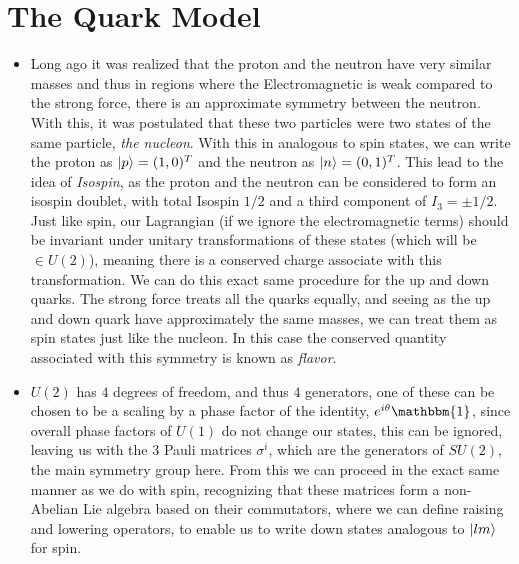 \documentclass[11pt]{article}
\numberwithin{equation}{section}
\begin{document}
\section{The Quark Model}
\begin{itemize}
    \item Long ago it was realized that the proton and the neutron have very similar masses and thus in regions where the Electromagnetic is weak compared to the strong force, there is an approximate symmetry between the neutron. With this, it was postulated that these two particles were two states of the same particle, \emph{the nucleon}. With this in analogous to spin states, we can write the proton as $\ket{p} = (1,0)^T$ and the neutron as $\ket{n} = (0,1)^T$. This lead to the idea of \emph{Isospin}, as the proton and the neutron can be considered to form an isospin doublet, with total Isospin $1/2$ and a third component of $I_3 = \pm1/2$. Just like spin, our Lagrangian (if we ignore the electromagnetic terms) should be invariant under unitary transformations of these states (which will be $\in U(2)$), meaning there is a conserved charge associate with this transformation. We can do this exact same procedure for the up and down quarks. The strong force treats all the quarks equally, and seeing as the up and down quark have approximately the same masses, we can treat them as spin states just like the nucleon. In this case the conserved quantity associated with this symmetry is known as \emph{flavor}. 

    \item $U(2)$ has $4$ degrees of freedom, and thus $4$ generators, one of these can be chosen to be a scaling by a phase factor of the identity, $e^{i\theta}\mathbbm{1}$, since overall phase factors of $U(1)$ do not change our states, this can be ignored, leaving us with the $3$ Pauli matrices $\sigma^i$, which are the generators of $SU(2)$, the main symmetry group here. From this we can proceed in the exact same manner as we do with spin, recognizing that these matrices form a non-Abelian Lie algebra based on their commutators, where we can define raising and lowering operators, to enable us to write down states analogous to $\ket{lm}$ for spin.
\end{itemize}

\subsection{} %
\label{sub:}

\end{document}
